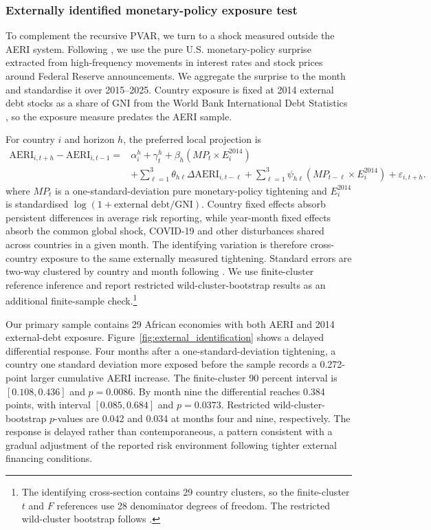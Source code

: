 \documentclass[12pt]{article}
\begin{document}
\clearpage
\subsubsection{Externally identified monetary-policy exposure test}\label{sec:external_identification}
To complement the recursive PVAR, we turn to a shock measured outside the AERI system. Following \citet{jarocinski2020}, we use the pure U.S. monetary-policy surprise extracted from high-frequency movements in interest rates and stock prices around Federal Reserve announcements. We aggregate the surprise to the month and standardise it over 2015--2025. Country exposure is fixed at 2014 external debt stocks as a share of GNI from the World Bank International Debt Statistics \citep{worldbankdebt}, so the exposure measure predates the AERI sample.

For country $i$ and horizon $h$, the preferred local projection is
\begin{equation}
\begin{aligned}
\mathrm{AERI}_{i,t+h}-\mathrm{AERI}_{i,t-1}
={}&\alpha_i^h+\gamma_t^h+\beta_h\left(MP_t\times E_i^{2014}\right)\\
&+\sum_{\ell=1}^{3}\theta_{h\ell}\Delta\mathrm{AERI}_{i,t-\ell}
+\sum_{\ell=1}^{3}\psi_{h\ell}\left(MP_{t-\ell}\times E_i^{2014}\right)
+\varepsilon_{i,t+h}.
\end{aligned}
\label{eq:external_id}
\end{equation}
where $MP_t$ is a one-standard-deviation pure monetary-policy tightening and $E_i^{2014}$ is standardised $\log(1+\text{external debt/GNI})$. Country fixed effects absorb persistent differences in average risk reporting, while year-month fixed effects absorb the common global shock, COVID-19 and other disturbances shared across countries in a given month. The identifying variation is therefore cross-country exposure to the same externally measured tightening. Standard errors are two-way clustered by country and month following \citet{cameron2011}. We use finite-cluster reference inference and report restricted wild-cluster-bootstrap results as an additional finite-sample check.\footnote{The identifying cross-section contains 29 country clusters, so the finite-cluster $t$ and $F$ references use 28 denominator degrees of freedom. The restricted wild-cluster bootstrap follows \citet{mackinnon2017}.}

Our primary sample contains 29 African economies with both AERI and 2014 external-debt exposure. Figure~\ref{fig:external_identification} shows a delayed differential response. Four months after a one-standard-deviation tightening, a country one standard deviation more exposed before the sample records a 0.272-point larger cumulative AERI increase. The finite-cluster 90 percent interval is $[0.108,0.436]$ and $p=0.0086$. By month nine the differential reaches 0.384 points, with interval $[0.085,0.684]$ and $p=0.0373$. Restricted wild-cluster-bootstrap $p$-values are 0.042 and 0.034 at months four and nine, respectively. The response is delayed rather than contemporaneous, a pattern consistent with a gradual adjustment of the reported risk environment following tighter external financing conditions.
\end{document}
